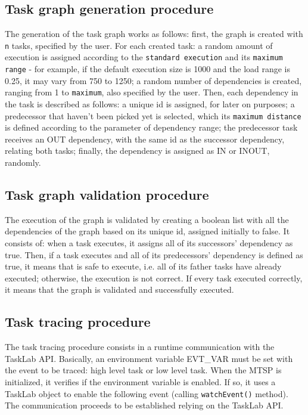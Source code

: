 \subsection{Task graph generation procedure}
The generation of the task graph works as follows: first, the graph is created with \texttt{n} tasks, specified by the user. For each created task: a random amount of execution is assigned according to the \texttt{standard execution} and its \texttt{maximum range} - for example, if the default execution size is 1000 and the load range is 0.25, it may vary from 750 to 1250; a random number of dependencies is created, ranging from 1 to \texttt{maximum}, also specified by the user.   Then, each dependency in the task is described as follows: a unique id is assigned, for later on purposes; a predecessor that haven't been picked yet is selected, which its \texttt{maximum distance} is defined according to the parameter of dependency range; the predecessor task receives an OUT dependency, with the same id as the successor dependency, relating both tasks; finally, the dependency is assigned as IN or INOUT, randomly. 

\subsection{Task graph validation procedure}
The execution of the graph is validated by creating a boolean list with all the dependencies of the graph based on its unique id, assigned initially to false. It consists of: when a task executes, it assigns all of its successors' dependency as true. Then, if a task executes and all of its predecessors' dependency is defined as true, it means that is safe to execute, i.e. all of its father tasks have already executed; otherwise, the execution is not correct. If every task executed correctly, it means that the graph is validated and successfully executed.

\subsection{Task tracing procedure}
The task tracing procedure consists in a runtime communication with the TaskLab API. Basically, an environment variable EVT\_VAR must be set with the event to be traced: high level task or low level task. When the MTSP is initialized, it verifies if the environment variable is enabled. If so, it uses a TaskLab object to enable the following event (calling \texttt{watchEvent()} method). The communication proceeds to be established relying on the TaskLab API. 

